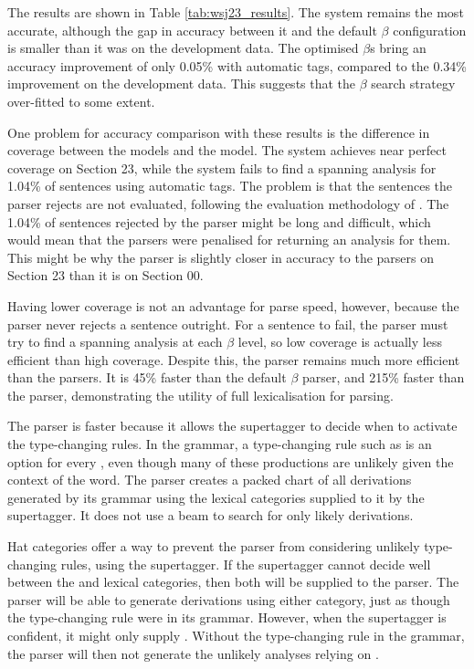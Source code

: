 The results are shown in Table \ref{tab:wsj23_results}. The
\ccgbank\hybrid\optbeta system remains the most accurate, although the gap in
accuracy between it and the \ccgbank default $\beta$ configuration is smaller
than it was on the development data. The optimised $\beta$s bring an accuracy
improvement of only 0.05\% with automatic \pos tags, compared to the 0.34\%
improvement on the development data. This suggests that the $\beta$ search
strategy over-fitted to some extent.

One problem for accuracy comparison with these results is the difference in
coverage between the \ccgbank models and the \hatsys model. The
\ccgbank\hybrid\optbeta system achieves near perfect coverage on Section 23,
while the \hatsys system fails to find a spanning analysis for 1.04\% of
sentences using automatic \pos tags. The problem is that the sentences the
\hatsys parser rejects are not evaluated, following the evaluation methodology
of \citet{clark:cl07}. The 1.04\% of sentences rejected by
the \hatsys parser might be long and difficult, which would mean that the
\ccgbank parsers were penalised for returning an analysis for them. This might
be why the \hatsys parser is slightly closer in accuracy to the \ccgbank parsers
on Section 23 than it is on Section 00.

Having lower coverage is not an advantage for parse speed, however, because the
parser never rejects a sentence outright. For a sentence to fail, the parser
must try to find a spanning analysis at each $\beta$ level, so low coverage is
actually less efficient than high coverage. Despite this, the \hatsys parser
remains much more efficient than the \ccgbank parsers. It is 45\% faster than
the \ccgbank default $\beta$ parser, and 215\%
faster than the \ccgbank \optbeta parser, demonstrating the utility of full
lexicalisation for parsing.

The \hatsys parser is faster because it allows the supertagger to decide when to
activate the type-changing rules. In the \ccgbank grammar, a type-changing rule
such as  is an option for every , even though
many of these productions are unlikely given the context of the word. The \candc
parser creates a packed chart of all derivations generated by its grammar
using the lexical categories supplied to it by the supertagger. It does
not use a beam to search for only likely derivations.

Hat categories offer a way to prevent the parser from considering unlikely type-changing
rules, using the supertagger. If the supertagger cannot decide well between the 
and  lexical categories, then both will be supplied to the parser.
The parser will be able to generate derivations using
either category, just as though the type-changing rule were in its grammar.
However, when the supertagger is confident, it might only supply .
Without the type-changing rule in the grammar, the parser will then not generate the
unlikely analyses relying on .

